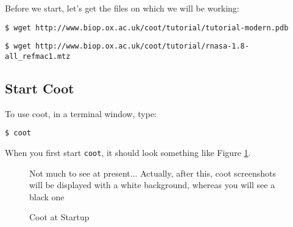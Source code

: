 \documentclass{article}
\newcommand {\atilde} {$_{\char '176}$} %
\begin{document}
Before we start, let's get the files on which we will be working:


\texttt{\small \$ wget http://www.biop.ox.ac.uk/coot/tutorial/tutorial-modern.pdb}

\texttt{\small \$ wget http://www.biop.ox.ac.uk/coot/tutorial/rnasa-1.8-all\_refmac1.mtz}





\subsection{Start Coot}








To use coot, in a terminal window, type:

\texttt{\$ coot}

When you first start \texttt{coot}, it should look
something like Figure \ref{fig:start-coot}.

\begin{figure}[htbp]
  \begin{center}
    \leavevmode
    \epsfxsize 70mm
    \caption{Coot at Startup}{Not much to see at present...
      Actually, after this, coot screenshots will be displayed with a
      white background, whereas you will see a black one}
    \label{fig:start-coot}
  \end{center}
\end{figure}
\end{document}
